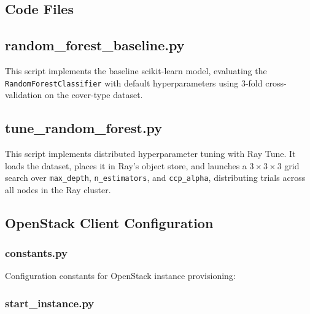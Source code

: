 \documentclass[11pt,a4paper]{article}
\begin{document}
\begin{appendices}

\section{Code Files}

\subsection{random\_forest\_baseline.py}

This script implements the baseline scikit-learn model, evaluating the
\texttt{RandomForestClassifier} with default hyperparameters using 3-fold
cross-validation on the cover-type dataset.



\subsection{tune\_random\_forest.py}
\label{app:tune_random_forest}

This script implements distributed hyperparameter tuning with Ray Tune.
It loads the dataset, places it in Ray's object store, and launches a
$3 \times 3 \times 3$ grid search over \texttt{max\_depth},
\texttt{n\_estimators}, and \texttt{ccp\_alpha}, distributing trials
across all nodes in the Ray cluster.



\subsection{OpenStack Client Configuration}

\subsubsection{constants.py}

Configuration constants for OpenStack instance provisioning:



\subsubsection{start\_instance.py}


\end{appendices}
\end{document}
